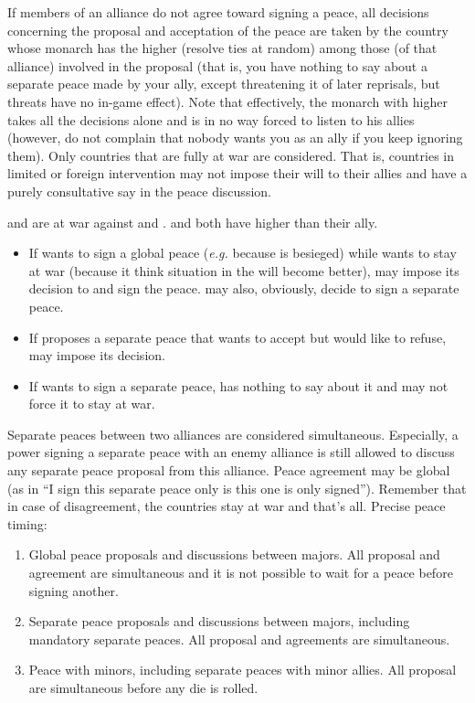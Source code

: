 \aparag[Disagreements]
\bparag If members of an alliance do not agree toward signing a peace, all
decisions concerning the proposal and acceptation of the peace are taken by
the country whose monarch has the higher \DIP (resolve ties at random) among
those (of that alliance) involved in the proposal (that is, you have nothing
to say about a separate peace made by your ally, except threatening it of
later reprisals, but threats have no in-game effect).
\bparag Note that effectively, the monarch with higher \DIP takes all the
decisions alone and is in no way forced to listen to his allies (however, do
not complain that nobody wants you as an ally if you keep ignoring them).
\bparag Only countries that are fully at war are considered. That is,
countries in limited or foreign intervention may not impose their will to
their allies and have a purely consultative say in the peace discussion. 

\begin{exemple}[Disagreements]
  \FRA and \SPA are at war against \HOL and \ANG. \FRA and  \HOL both have
  higher \DIP than their ally.
  \begin{itemize}
  \item If \HOL wants to sign a global peace (\emph{e.g.} because
    \villeAmsterdam is besieged) while \ANG wants to stay at war (because it
    think situation in the \ROTW will become better), \HOL may impose its
    decision to \ANG and sign the peace. \HOL may also, obviously, decide to
    sign a separate peace.
  \item If \HOL proposes a separate peace that \FRA wants to accept but \HIS
    would like to refuse, \FRA may impose its decision.
  \item If \ANG wants to sign a separate peace, \HOL has nothing to say about
    it and may not force it to stay at war.
  \end{itemize}
\end{exemple}

Separate peaces between two alliances are considered simultaneous. Especially,
a power signing a separate peace with an enemy alliance is still allowed to
discuss any separate peace proposal from this alliance. Peace agreement may be
global (as in ``I sign this separate peace only is this one is only
signed''). Remember that in case of disagreement, the countries stay at war
and that's all.
\bparag Precise peace timing:
\begin{enumerate}
\item Global peace proposals and discussions between majors. All proposal and
  agreement are simultaneous and it is not possible to wait for a peace before
  signing another.
\item Separate peace proposals and discussions between majors, including
  mandatory separate peaces. All proposal and agreements are simultaneous.
\item Peace with minors, including separate peaces with minor allies. All
  proposal are simultaneous before any die is rolled.
\end{enumerate}


